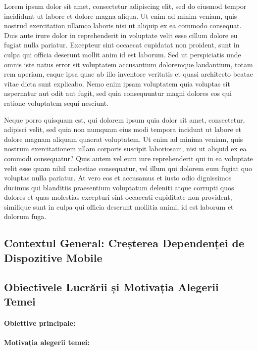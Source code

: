 \documentclass[11pt,a4paper,twocolumn]{article}
\theoremstyle{definition}
\theoremstyle{plain}
\theoremstyle{remark}
\begin{document}
Lorem ipsum dolor sit amet, consectetur adipiscing elit, sed do eiusmod tempor incididunt ut labore et dolore magna aliqua. Ut enim ad minim veniam, quis nostrud exercitation ullamco laboris nisi ut aliquip ex ea commodo consequat. Duis aute irure dolor in reprehenderit in voluptate velit esse cillum dolore eu fugiat nulla pariatur. Excepteur sint occaecat cupidatat non proident, sunt in culpa qui officia deserunt mollit anim id est laborum. Sed ut perspiciatis unde omnis iste natus error sit voluptatem accusantium doloremque laudantium, totam rem aperiam, eaque ipsa quae ab illo inventore veritatis et quasi architecto beatae vitae dicta sunt explicabo. Nemo enim ipsam voluptatem quia voluptas sit aspernatur aut odit aut fugit, sed quia consequuntur magni dolores eos qui ratione voluptatem sequi nesciunt.

Neque porro quisquam est, qui dolorem ipsum quia dolor sit amet, consectetur, adipisci velit, sed quia non numquam eius modi tempora incidunt ut labore et dolore magnam aliquam quaerat voluptatem. Ut enim ad minima veniam, quis nostrum exercitationem ullam corporis suscipit laboriosam, nisi ut aliquid ex ea commodi consequatur? Quis autem vel eum iure reprehenderit qui in ea voluptate velit esse quam nihil molestiae consequatur, vel illum qui dolorem eum fugiat quo voluptas nulla pariatur. At vero eos et accusamus et iusto odio dignissimos ducimus qui blanditiis praesentium voluptatum deleniti atque corrupti quos dolores et quas molestias excepturi sint occaecati cupiditate non provident, similique sunt in culpa qui officia deserunt mollitia animi, id est laborum et dolorum fuga.

\subsection{Contextul General: Creșterea Dependenței de Dispozitive Mobile}

\subsection{Obiectivele Lucrării și Motivația Alegerii Temei}

\paragraph{Obiettive principale:}

\paragraph{Motivația alegerii temei:}
\end{document}
